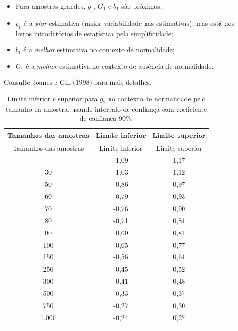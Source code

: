 \documentclass[
  10pt,
  ignorenonframetext,
]{beamer}
\providecommand{\tightlist}{%
  \setlength{\itemsep}{0pt}\setlength{\parskip}{0pt}}\usepackage{longtable,booktabs,array}
\begin{document}
\begin{frame}
\begin{itemize}
\tightlist
\item
  Para amostras grandes, \(g_1\), \(G_1\) e \(b_1\) são próximos.
\item
  \(g_1\) é a \emph{pior} estimativa (maior variabilidade nas
  estimativas), mas está nos livros introdutórios de estatística pela
  simplificidade;
\item
  \(b_1\) é a \emph{melhor} estimativa no contexto de normalidade;
\item
  \(G_1\) é a \emph{melhor} estimativa no contexto de ausência de
  normalidade.
\end{itemize}

Consulte Joanes e Gill (1998) para mais detalhes.
\end{frame}

\begin{frame}
\begin{longtable}[]{@{}ccc@{}}
\caption{Limite inferior e superior para \(g_2\) no contexto de
normalidade pelo tamanho da amostra, usando intervalo de confiança com
coeficiente de confiança 90\%.}\tabularnewline
\toprule\noalign{}
Tamanhos das amostras & Limite inferior & Limite superior \\
\midrule\noalign{}
\endfirsthead
\toprule\noalign{}
Tamanhos das amostras & Limite inferior & Limite superior \\
\midrule\noalign{}
\endhead
25 & -1,09 & 1,17 \\
30 & -1,03 & 1,12 \\
50 & -0,86 & 0,97 \\
60 & -0,79 & 0,93 \\
70 & -0,76 & 0,90 \\
80 & -0,71 & 0,84 \\
90 & -0,69 & 0,81 \\
100 & -0,65 & 0,77 \\
150 & -0,56 & 0,64 \\
250 & -0,45 & 0,52 \\
300 & -0,41 & 0,48 \\
500 & -0,33 & 0,37 \\
750 & -0,27 & 0,30 \\
1.000 & -0,24 & 0,27 \\
\bottomrule\noalign{}
\end{longtable}
\end{frame}
\end{document}
